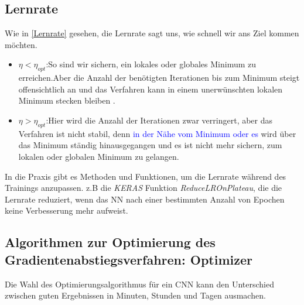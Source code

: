\documentclass[12pt,a4paper]{scrartcl}
\numberwithin{equation}{section}
\begin{document}
\subsection{Lernrate}\label{Experiment:Lernrate}
Wie in \ref{Lernrate} gesehen, die Lernrate sagt uns, wie schnell wir ans Ziel kommen möchten.
\begin{itemize}
	\item $ \eta < \eta_{opt} $:So sind wir sichern, ein lokales oder globales Minimum zu erreichen.Aber die Anzahl der benötigten Iterationen bis zum Minimum steigt offensichtlich an und das Verfahren kann in einem unerwünschten lokalen Minimum stecken bleiben .
	\item $ \eta > \eta_{opt} $:Hier wird die Anzahl der Iterationen zwar verringert, aber das Verfahren ist nicht stabil, denn \textcolor{blue}{in der Nähe vom Minimum oder es} wird über das Minimum ständig hinausgegangen und es ist nicht mehr sichern, zum lokalen oder globalen Minimum zu gelangen.
\end{itemize}
In die Praxis gibt es Methoden und Funktionen, um die Lernrate während des Trainings anzupassen. z.B die \textit{KERAS} Funktion \textit{ReduceLROnPlateau}, die die Lernrate reduziert, wenn das \ac{NN} nach einer bestimmten Anzahl von Epochen keine Verbesserung mehr aufweist.

\subsection{Algorithmen zur Optimierung des Gradientenabstiegsverfahren:	Optimizer}
Die Wahl des Optimierungsalgorithmus für ein \ac{CNN} kann den Unterschied zwischen guten Ergebnissen in Minuten, Stunden und Tagen ausmachen.
\end{document}
